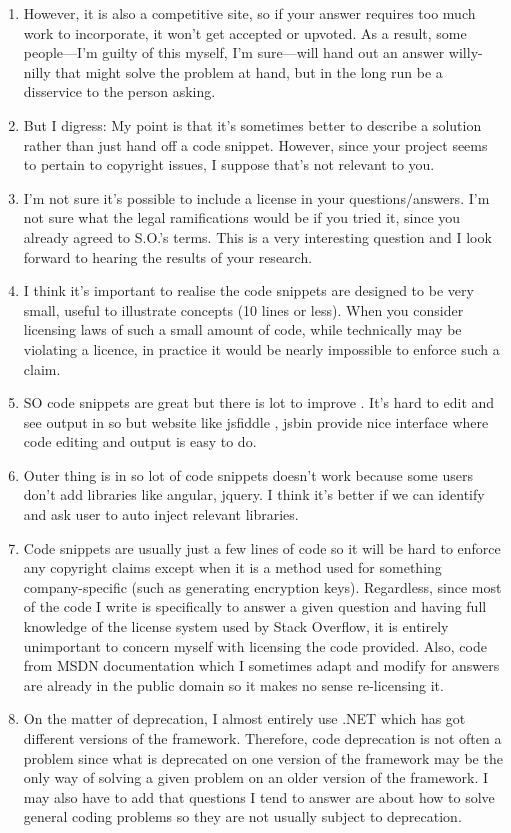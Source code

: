 \documentclass{svjour3}                     %
\begin{document}
\begin{enumerate}
	\item However, it is also a competitive site, so if your answer requires too much work to incorporate, it won't get accepted or upvoted. As a result, some people---I'm guilty of this myself, I'm sure---will hand out an answer willy-nilly that might solve the problem at hand, but in the long run be a disservice to the person asking.
	\item But I digress: My point is that it's sometimes better to describe a solution rather than just hand off a code snippet. However, since your project seems to pertain to copyright issues, I suppose that's not relevant to you.
	\item I'm not sure it's possible to include a license in your questions/answers. I'm not sure what the legal ramifications would be if you tried it, since you already agreed to S.O.'s terms. This is a very interesting question and I look forward to hearing the results of your research.
	\item I think it's important to realise the code snippets are designed to be very small, useful to illustrate concepts (10 lines or less). When you consider licensing laws of such a small amount of code, while technically may be violating a licence, in practice it would be nearly impossible to enforce such a claim.
	\item SO code snippets are great but there is lot to improve . It's hard to edit and see output in so but website like jsfiddle , jsbin provide nice interface where code editing and output is easy to do.
	\item Outer thing is in so lot of code snippets doesn't work because some users don't add libraries like angular, jquery. I think it's better if we can identify and ask user to auto inject relevant libraries.
	\item Code snippets are usually just a few lines of code so it will be hard to enforce any copyright claims except when it is a method used for something company-specific (such as generating encryption keys). Regardless, since most of the code I write is specifically to answer a given question and having full knowledge of the license system used by Stack Overflow, it is entirely unimportant to concern myself with licensing the code provided. Also, code from MSDN documentation which I sometimes adapt and modify for answers are already in the public domain so it makes no sense re-licensing it.
	\item On the matter of deprecation, I almost entirely use .NET which has got different versions of the framework. Therefore, code deprecation is not often a problem since what is deprecated on one version of the framework may be the only way of solving a given problem on an older version of the framework. I may also have to add that questions I tend to answer are about how to solve general coding problems so they are not usually subject to deprecation.

\end{enumerate}
\end{document}
